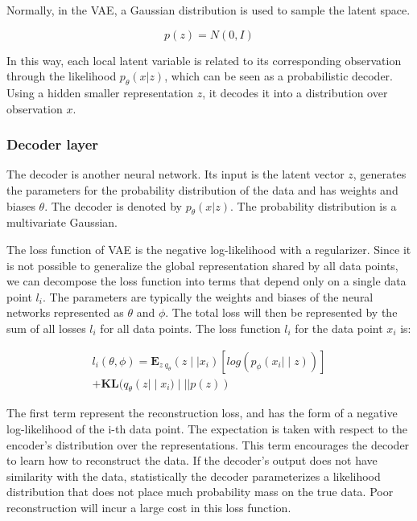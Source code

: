 \documentclass[nouppercase]{ifmbe}
\begin{document}
Normally, in the VAE, a Gaussian distribution is used to sample the latent space.

\begin{equation}
    p(z)=N(0,I) 
    \label{eq1}
\end{equation}


In this way, each local latent variable is related to its corresponding observation through the likelihood $p_\theta(x|z)$, which can be seen as a probabilistic decoder. Using a hidden smaller representation $z$, it decodes it into a distribution over observation $x$.

\subsubsection{Decoder layer}

The decoder is another neural network. Its input is the latent vector $z$, generates the parameters for the probability distribution of the data and has weights and biases $\theta$. The decoder is denoted by $p_\theta (x|z)$. The probability distribution is a multivariate Gaussian.

The loss function of VAE is the negative log-likelihood with a regularizer. Since it is not possible to
generalize the global representation shared by all data points, we can decompose the loss function into terms
that depend only on a single data point $l_i$. The parameters are typically the weights and biases of the
neural networks represented as $\theta$ and $\phi$. The total loss will then be represented by the sum of
all losses $l_i$ for all data points. The loss function $l_i$ for the data point $x_i$ is:

\begin{equation}
    \begin{split}
        l_i(\theta,\phi) = \mathbf{E}_{z~q_\theta}(z ∣| x_i)[log(p_\phi(x_i |∣ z))] \\
        +\mathbf{KL} (q_\theta(z |∣ x_i)∣|| p(z))
        \label{eq2}
    \end{split}
\end{equation}

The first term represent the reconstruction loss, and has the form of a negative log-likelihood of the i-th data point. The expectation is taken with respect to the encoder’s distribution over the representations. This term encourages the decoder to learn how to reconstruct the data. If the decoder’s output does not have similarity with the data, statistically the decoder parameterizes a likelihood distribution that does not place much probability mass on the true data. Poor reconstruction will incur a large cost in this loss function.
\end{document}
